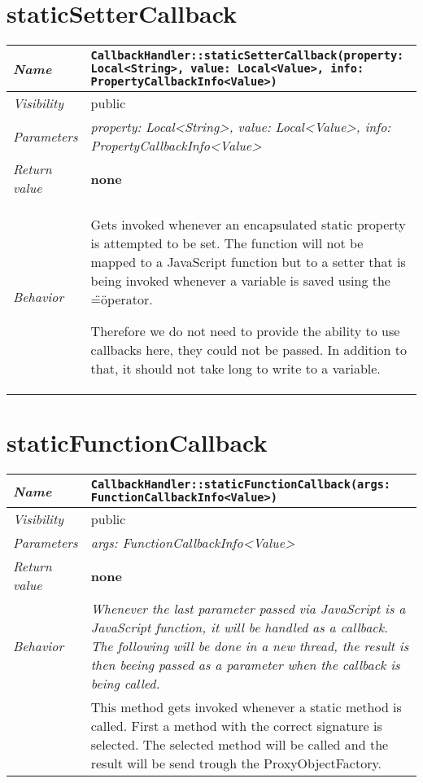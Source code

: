  \section{staticSetterCallback}
\begin{longtable}{p{3cm} @{\hskip 1cm} p{12cm}}
 \hline
\textit{Name} & \texttt{CallbackHandler::staticSetterCallback(property: Local<String>, value: Local<Value>, info: PropertyCallbackInfo<Value>)}\\
\hline
 \textit{Visibility} & public\\
\hline
\textit{Parameters} & \textit{property: Local<String>, value: Local<Value>, info: PropertyCallbackInfo<Value>}\\
\hline
\textit{Return value} & \textbf{none}\\
  \hline
 \textit{Behavior} & Gets invoked whenever an encapsulated static property is attempted to be set. The function will not be mapped to a JavaScript function but to a setter that is being invoked whenever a variable is saved using the \"=\" operator.

 Therefore we do not need to provide the ability to use callbacks here, they could not be passed. In addition to that, it should not take long to write to a variable. \\
\hline
\end{longtable} \pagebreak
 \section{staticFunctionCallback}
\begin{longtable}{p{3cm} @{\hskip 1cm} p{12cm}}
 \hline
\textit{Name} & \texttt{CallbackHandler::staticFunctionCallback(args: FunctionCallbackInfo<Value>)}\\
\hline
 \textit{Visibility} & public\\
\hline
\textit{Parameters} & \textit{args: FunctionCallbackInfo<Value>}\\
\hline
\textit{Return value} & \textbf{none}\\
  \hline
 \textit{Behavior} & \textit{Whenever the last parameter passed via JavaScript is a JavaScript function, it will be handled as a callback. The following will be done in a new thread, the result is then beeing passed as a parameter when the callback is being called.}\\

 & This method gets invoked whenever a static method is called. First a method with the correct signature is selected.
 The selected method will be called and the result will be send trough the ProxyObjectFactory. \\
\hline
\end{longtable} \pagebreak
